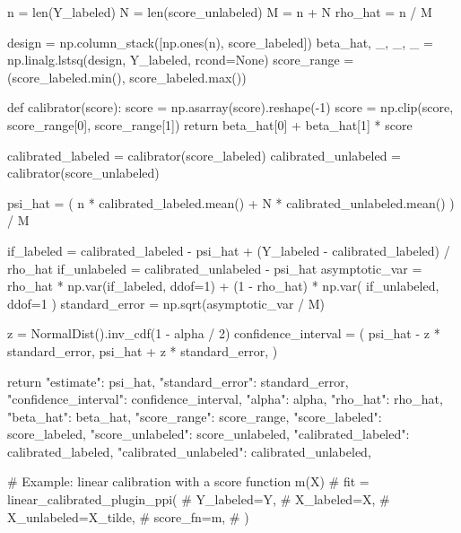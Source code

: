 \documentclass{article}
\theoremstyle{plain}
\theoremstyle{definition}
\newcommand{\1}{\mathbbm{1}}
\begin{document}
\begin{codeblock}
    n = len(Y_labeled)
    N = len(score_unlabeled)
    M = n + N
    rho_hat = n / M

    design = np.column_stack([np.ones(n), score_labeled])
    beta_hat, _, _, _ = np.linalg.lstsq(design, Y_labeled, rcond=None)
    score_range = (score_labeled.min(), score_labeled.max())

    def calibrator(score):
        score = np.asarray(score).reshape(-1)
        score = np.clip(score, score_range[0], score_range[1])
        return beta_hat[0] + beta_hat[1] * score

    calibrated_labeled = calibrator(score_labeled)
    calibrated_unlabeled = calibrator(score_unlabeled)

    psi_hat = (
        n * calibrated_labeled.mean() + N * calibrated_unlabeled.mean()
    ) / M

    if_labeled = calibrated_labeled - psi_hat + (Y_labeled - calibrated_labeled) / rho_hat
    if_unlabeled = calibrated_unlabeled - psi_hat
    asymptotic_var = rho_hat * np.var(if_labeled, ddof=1) + (1 - rho_hat) * np.var(
        if_unlabeled, ddof=1
    )
    standard_error = np.sqrt(asymptotic_var / M)

    z = NormalDist().inv_cdf(1 - alpha / 2)
    confidence_interval = (
        psi_hat - z * standard_error,
        psi_hat + z * standard_error,
    )

    return {
        "estimate": psi_hat,
        "standard_error": standard_error,
        "confidence_interval": confidence_interval,
        "alpha": alpha,
        "rho_hat": rho_hat,
        "beta_hat": beta_hat,
        "score_range": score_range,
        "score_labeled": score_labeled,
        "score_unlabeled": score_unlabeled,
        "calibrated_labeled": calibrated_labeled,
        "calibrated_unlabeled": calibrated_unlabeled,
    }


# Example: linear calibration with a score function m(X)
# fit = linear_calibrated_plugin_ppi(
#     Y_labeled=Y,
#     X_labeled=X,
#     X_unlabeled=X_tilde,
#     score_fn=m,
# )
\end{codeblock}
\end{document}
